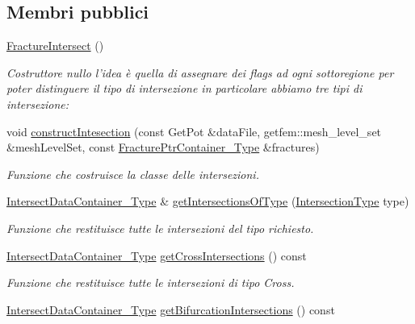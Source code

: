 \subsection*{Membri pubblici}
\begin{DoxyCompactItemize}
\item 
\hyperlink{classFractureIntersect_a2416c29105bde5cbf9032b04db47ba31}{Fracture\-Intersect} ()
\begin{DoxyCompactList}\small\item\em Costruttore nullo l'idea è quella di assegnare dei flags ad ogni sottoregione per poter distinguere il tipo di intersezione in particolare abbiamo tre tipi di intersezione\-: \end{DoxyCompactList}\item 
void \hyperlink{classFractureIntersect_a2c2e9ee88e96b0fafffc596237b44549}{construct\-Intesection} (const Get\-Pot \&data\-File, getfem\-::mesh\-\_\-level\-\_\-set \&mesh\-Level\-Set, const \hyperlink{FractureHandler_8h_a2f0b57e18ecf89912d7de0c87158009e}{Fracture\-Ptr\-Container\-\_\-\-Type} \&fractures)
\begin{DoxyCompactList}\small\item\em Funzione che costruisce la classe delle intersezioni. \end{DoxyCompactList}\item 
\hyperlink{IntersectData_8h_a822ec3b760dfb603e1cf0bfe3ad5636a}{Intersect\-Data\-Container\-\_\-\-Type} \& \hyperlink{classFractureIntersect_a891c902329fde6f8de70bb1bf371ccbc}{get\-Intersections\-Of\-Type} (\hyperlink{classFractureIntersect_a9a4e4a784fa4c8e359767ed543f89dc5}{Intersection\-Type} type)
\begin{DoxyCompactList}\small\item\em Funzione che restituisce tutte le intersezioni del tipo richiesto. \end{DoxyCompactList}\item 
\hyperlink{IntersectData_8h_a822ec3b760dfb603e1cf0bfe3ad5636a}{Intersect\-Data\-Container\-\_\-\-Type} \hyperlink{classFractureIntersect_a248df8f326f844e34d807234efdfd693}{get\-Cross\-Intersections} () const 
\begin{DoxyCompactList}\small\item\em Funzione che restituisce tutte le intersezioni di tipo Cross. \end{DoxyCompactList}\item 
\hyperlink{IntersectData_8h_a822ec3b760dfb603e1cf0bfe3ad5636a}{Intersect\-Data\-Container\-\_\-\-Type} \hyperlink{classFractureIntersect_a18ff664767b7e8ffa876b80a6100e74d}{get\-Bifurcation\-Intersections} () const 

\end{DoxyCompactItemize}
